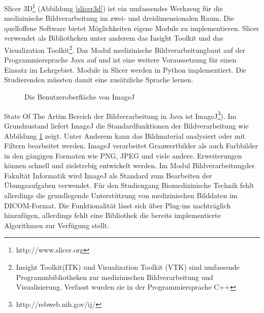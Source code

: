 Slicer 3D\footnote{http://www.slicer.org} (Abbildung \ref{slicer3d}) ist ein umfassendes Werkzeug für die medizinische Bildverarbeitung im zwei- und dreidimensionalen Raum. Die quelloffene Software bietet Möglichkeiten eigene Module zu implementieren. Slicer verwendet als Bibliotheken unter anderem das Insight Toolkit und das Visualization Toolkit\footnote{Insight Toolkit(ITK) und Visualization Toolkit (VTK) sind umfassende Programmbibliotheken zur medizinischen Bildverarbeitung und Visualisierung. Verfasst wurden sie in der Programmiersprache C++}. Das Modul \glqq medizinische Bildverarbeitung\grqq baut auf der Programmiersprache Java auf und ist eine weitere Voraussetzung für einen Einsatz im Lehrgebiet. Module in Slicer werden in Python implementiert. Die Studierenden müssten damit eine zusätzliche Sprache lernen.\\

\begin{figure}[htbp]
  \vspace{0.5cm}
  \centering
  \caption{Die Benutzeroberfläche von ImageJ}
  \label{imagej}
  \vspace{0.5cm}
\end{figure}

\glqq State Of The Art\grqq im Bereich der Bildverarbeitung in Java ist ImageJ\footnote{http://rsbweb.nih.gov/ij/}). Im Grundzustand liefert ImageJ die Standardfunktionen der Bildverarbeitung wie Abbildung \ref{imagej} zeigt. Unter Anderem kann das Bildmaterial analysiert oder mit Filtern bearbeitet werden. ImageJ verarbeitet Grauwertbilder als auch Farbbilder in den gängigen Formaten wie PNG, JPEG und viele andere. Erweiterungen können schnell und zielstrebig entwickelt werden. Im Modul \glqq Bildverarbeitung\grqq der Fakultät Informatik wird ImageJ als Standard zum Bearbeiten der Übungsaufgaben verwendet. Für den Studiengang Biomedizinische Technik fehlt allerdings die grundlegende Unterstützung von medizinischen Bilddaten im DICOM-Format. Die Funktionalität lässt sich über Plug-ins nachträglich hinzufügen, allerdings fehlt eine Bibliothek die bereits implementierte Algorithmen zur Verfügung stellt.

